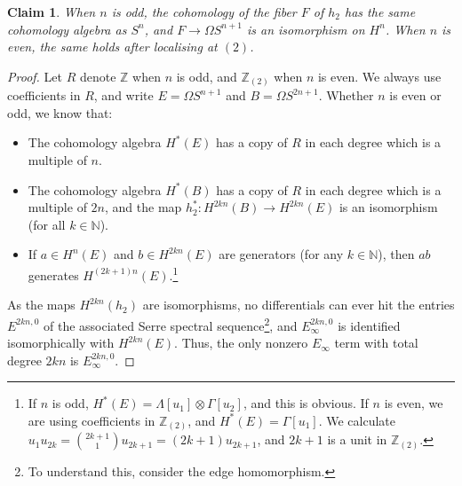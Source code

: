 \documentclass{article}
\newcommand{\N}{\mathbb{N}}
\newcommand{\Z}{\mathbb{Z}}
\renewcommand{\to}{\longrightarrow}
\newtheorem{claim}[thm]{Claim}
\theoremstyle{definition}
\begin{document}
\begin{claim}\label{SerreSSEHPfiberArg}
When $n$ is odd, the cohomology of the fiber $F$ of $h_2$ has the same cohomology algebra as $S^n$, and $F\to \Omega S^{n+1}$ is an isomorphism on $H^n$. When $n$ is even, the same holds after localising at $(2)$.
\end{claim}
\begin{proof}
Let $R$ denote $\Z$ when $n$ is odd, and $\Z_{(2)}$ when $n$ is even. We always use coefficients in $R$, and write $E=\Omega S^{n+1}$ and $B=\Omega S^{2n+1}$. Whether $n$ is even or odd, we know that:
\begin{itemize}
\item The cohomology algebra $H^*(E)$ has a copy of $R$ in each degree which is a multiple of $n$.
\item The cohomology algebra $H^*(B)$ has a copy of $R$ in each degree which is a multiple of $2n$, and the map $h_2^*:H^{2kn}(B)\to H^{2kn}(E)$ is an isomorphism (for all $k\in\N$).
\item If $a\in H^{n}(E)$ and $b\in H^{2kn}(E)$ are generators (for any $k\in\N$), then $ab$ generates $H^{(2k+1)n}(E)$.\footnote{If $n$ is odd, $H^*(E)=\Lambda[u_1]\otimes \Gamma[u_2]$, and this is obvious. If $n$ is even, we are using coefficients in $\Z_{(2)}$, and $H^*(E)=\Gamma[u_1]$. We calculate $u_1u_{2k}=\binom{2k+1}{1}u_{2k+1}=(2k+1)u_{2k+1}$, and $2k+1$ is a unit in $\Z_{(2)}$.}
\end{itemize}

As the maps $H^{2kn}(h_2)$ are isomorphisms, no differentials can ever hit the entries $E^{2kn,0}$ of the associated Serre spectral sequence\footnote{To understand this, consider the edge homomorphism.}, and $E^{2kn,0}_\infty$ is identified isomorphically with $H^{2kn}(E)$.
Thus, the only nonzero $E_\infty$ term with total degree $2kn$ is $E_\infty^{2kn,0}$.


\end{proof}
\end{document}
